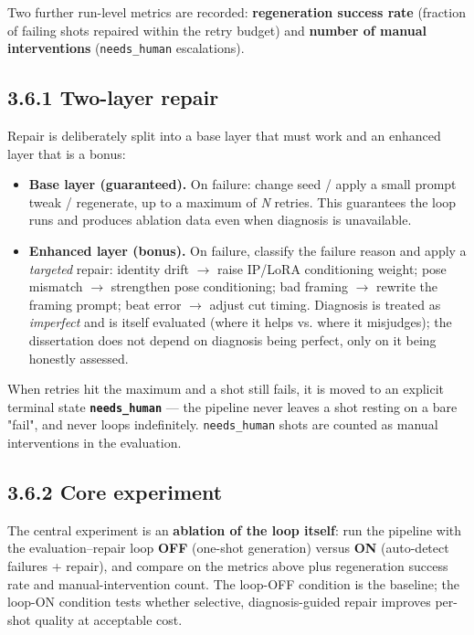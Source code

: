 \documentclass[10pt,twocolumn,letterpaper]{article}
\begin{document}
Two further run-level metrics are recorded: \textbf{regeneration success rate} (fraction of failing shots repaired within the retry budget) and \textbf{number of manual interventions} (\texttt{needs\_human} escalations).

\subsection*{3.6.1 Two-layer repair}

Repair is deliberately split into a base layer that must work and an enhanced layer that is a bonus:

\begin{itemize}[leftmargin=1.2em,itemsep=1pt,topsep=2pt]

\item \textbf{Base layer (guaranteed).} On failure: change seed / apply a small prompt tweak / regenerate, up to a maximum of \emph{N} retries. This guarantees the loop runs and produces ablation data even when diagnosis is unavailable.

\item \textbf{Enhanced layer (bonus).} On failure, classify the failure reason and apply a \emph{targeted} repair: identity drift $\rightarrow$ raise IP/LoRA conditioning weight; pose mismatch $\rightarrow$ strengthen pose conditioning; bad framing $\rightarrow$ rewrite the framing prompt; beat error $\rightarrow$ adjust cut timing. Diagnosis is treated as \emph{imperfect} and is itself evaluated (where it helps vs. where it misjudges); the dissertation does not depend on diagnosis being perfect, only on it being honestly assessed.

\end{itemize}

When retries hit the maximum and a shot still fails, it is moved to an explicit terminal state \textbf{\texttt{needs\_human}} --- the pipeline never leaves a shot resting on a bare "fail", and never loops indefinitely. \texttt{needs\_human} shots are counted as manual interventions in the evaluation.

\subsection*{3.6.2 Core experiment}

The central experiment is an \textbf{ablation of the loop itself}: run the pipeline with the evaluation--repair loop \textbf{OFF} (one-shot generation) versus \textbf{ON} (auto-detect failures + repair), and compare on the metrics above plus regeneration success rate and manual-intervention count. The loop-OFF condition is the baseline; the loop-ON condition tests whether selective, diagnosis-guided repair improves per-shot quality at acceptable cost.
\end{document}
